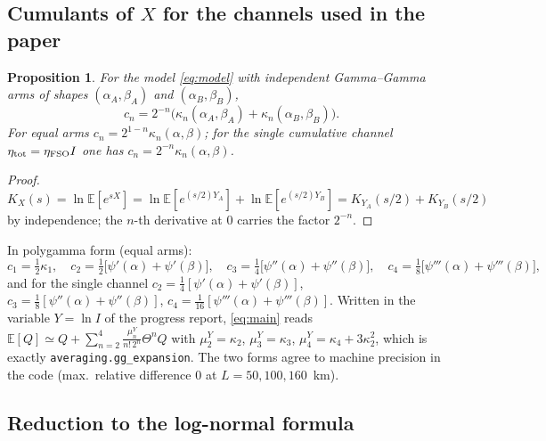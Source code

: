 \documentclass[11pt,a4paper]{article}
\theoremstyle{plain}
\newtheorem{proposition}{Proposition}
\theoremstyle{remark}
\begin{document}
\subsection{Cumulants of $X$ for the channels used in the paper}
\label{sec:cumX}

\begin{proposition}\label{prop:cX}
For the model \eqref{eq:model} with independent Gamma--Gamma arms of shapes $(\alpha_A,\beta_A)$ and $(\alpha_B,\beta_B)$,
\begin{equation}
  c_n=2^{-n}\big(\kappa_n(\alpha_A,\beta_A)+\kappa_n(\alpha_B,\beta_B)\big).
\end{equation}
For equal arms $c_n=2^{1-n}\kappa_n(\alpha,\beta)$; for the single cumulative channel $\eta_{\rm tot}=\eta_{\rm FSO}I$ one has $c_n=2^{-n}\kappa_n(\alpha,\beta)$.
\end{proposition}
\begin{proof}
$K_X(s)=\ln\mathbb E[e^{sX}]=\ln\mathbb E[e^{(s/2)Y_A}]+\ln\mathbb E[e^{(s/2)Y_B}]=K_{Y_A}(s/2)+K_{Y_B}(s/2)$ by independence; the $n$-th derivative at $0$ carries the factor $2^{-n}$.
\end{proof}
In polygamma form (equal arms):
\begin{equation}
  c_1=\tfrac12\kappa_1,\quad c_2=\tfrac12\big[\psi'(\alpha)+\psi'(\beta)\big],\quad
  c_3=\tfrac14\big[\psi''(\alpha)+\psi''(\beta)\big],\quad
  c_4=\tfrac18\big[\psi'''(\alpha)+\psi'''(\beta)\big],
\end{equation}
and for the single channel $c_2=\tfrac14[\psi'(\alpha)+\psi'(\beta)]$, $c_3=\tfrac18[\psi''(\alpha)+\psi''(\beta)]$, $c_4=\tfrac1{16}[\psi'''(\alpha)+\psi'''(\beta)]$. Written in the variable $Y=\ln I$ of the progress report, \eqref{eq:main} reads $\mathbb E[Q]\simeq Q+\sum_{n=2}^{4}\frac{\mu^Y_n}{n!\,2^{n}}\Theta^nQ$ with $\mu^Y_2=\kappa_2$, $\mu^Y_3=\kappa_3$, $\mu^Y_4=\kappa_4+3\kappa_2^2$, which is exactly \texttt{averaging.gg\_expansion}. The two forms agree to machine precision in the code (max.\ relative difference $0$ at $L=50,100,160$~km).

\subsection{Reduction to the log-normal formula}
\end{document}
